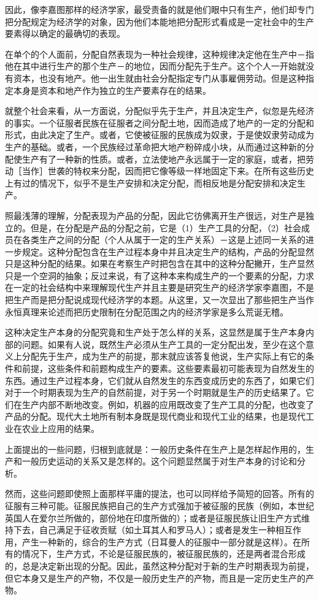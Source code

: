 \documentclass[a4paper,twoside,12pt,AutoFakeBold]{ctexart}
\begin{document}
因此，像李嘉图那样的经济学家，最受责备的就是他们眼中只有生产，他们却专门把分配规定为经济学的对象，因为他们本能地把分配形式看成是一定社会中的生产要素得以确定的最确切的表现。

在单个的个人面前，分配自然表现为一种社会规律，这种规律决定他在生产中－指他在其中进行生产的那个生产－的地位，因而分配先于生产。这个个人一开始就没有资本，也没有地产。他一出生就由社会分配指定专门从事雇佣劳动。但是这种指定本身是资本和地产作为独立的生产要素存在的结果。

就整个社会来看，从一方面说，分配似乎先于生产，并且决定生产，似忽是先经济的事实。一个征服者民族在征服者之间分配土地，因而造成了地产的一定的分配和形式，由此决定了生产。或者，它使被征服的民族成为奴隶，于是使奴隶劳动成为生产的基础。或者，一个民族经过革命把大地产粉碎成小块，从而通过这种新的分配使生产有了一种新的性质。或者，立法使地产永远属于一定的家庭，或者，把劳动［当作］世袭的特权来分配，因而把它像等级一样地固定下来。在所有这些历史上有过的情况下，似乎不是生产安排和决定分配，而相反地是分配安排和决定生产。

照最浅薄的理解，分配表现为产品的分配，因此它彷佛离开生产很远，对生产是独立的。但是，在分配是产品的分配之前，它是（1）生产工具的分配，（2）社会成员在各类生产之间的分配（个人从属于一定的生产关系）－这是上述同一关系的进一步规定。这种分配包含在生产过程本身中并且决定生产的结构，产品的分配显然只是这种分配的结果。如果在考察生产时把包含在其中的这种分配撇开，生产显然只是一个空洞的抽象；反过来说，有了这种本来构成生产的一个要素的分配，力求在一定的社会结构中来理解现代生产并且主要是研究生产的经济学家李嘉图，不是把生产而是把分配说成现代经济学的本题。从这里，又一次显出了那些把生产当作永恒真理来论述而把历史限制在分配范围之内的经济学家是多么荒诞无稽。

这种决定生产本身的分配究竟和生产处于怎么样的关系，这显然是属于生产本身内部的问题。如果有人说，既然生产必须从生产工具的一定分配出发，至少在这个意义上分配先于生产，成为生产的前提，那末就应该答复他说，生产实际上有它的条件和前提，这些条件和前题构成生产的要素。这些要素最初可能表现为自然发生的东西。通过生产过程本身，它们就从自然发生的东西变成历史的东西了，如果它们对于一个时期表现为生产的自然前提，对于另一个时期就是生产的历史结果了。它们在生产内部不断地改变。例如，机器的应用既改变了生产工具的分配，也改变了产品的分配。现代大土地所有制本身既是现代商业和现代工业的结果，也是现代工业在农业上应用的结果。

上面提出的一些问题，归根到底就是：一般历史条件在生产上是怎样起作用的，生产和一般历史运动的关系又是怎样的。这个问题显然属于对生产本身的讨论和分析。

然而，这些问题即使照上面那样平庸的提法，也可以同样给予简短的回答。所有的征服有三种可能。征服民族把自己的生产方式强加于被征服的民族（例如，本世纪英国人在爱尔兰所做的，部份地在印度所做的）；或者是征服民族让旧生产方式维持下去，自己满足于征收贡赋（如土耳其人和罗马人）；或者是发生一种相互作用，产生一种新的，综合的生产方式（日耳曼人的征服中一部分就是这样）。在所有的情况下，生产方式，不论是征服民族的，被征服民族的，还是两者混合形成的，总是决定新出现的分配。因此，虽然这种分配对于新的生产时期表现为前提，但它本身又是生产的产物，不仅是一般历史生产的产物，而且是一定历史生产的产物。
\end{document}
